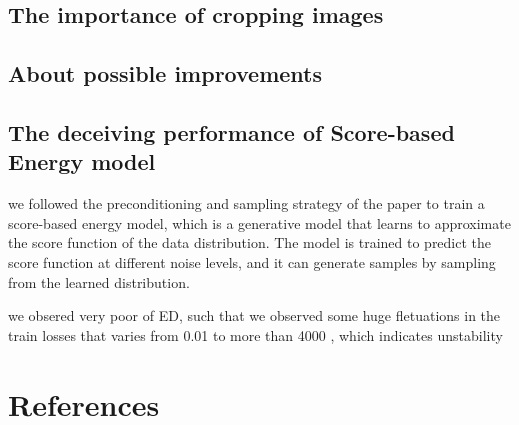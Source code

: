 \documentclass[twocolumn,superscriptaddress,aps]{revtex4-1}
\begin{document}
\subsection{The importance of cropping images}

\subsection{About possible improvements}


\subsection{The deceiving performance of Score-based Energy model}

we followed the preconditioning and sampling strategy of the paper \cite{karras2022elucidating} to train a score-based energy model, which is a generative model that learns to approximate the score function of the data distribution. The model is trained to predict the score function at different noise levels, and it can generate samples by sampling from the learned distribution.

we obsered very poor of ED, such that we observed some huge fletuations in the train losses that varies from 0.01 to more than 4000 , which indicates unstability 



\newpage
\section{References}



\end{document}
